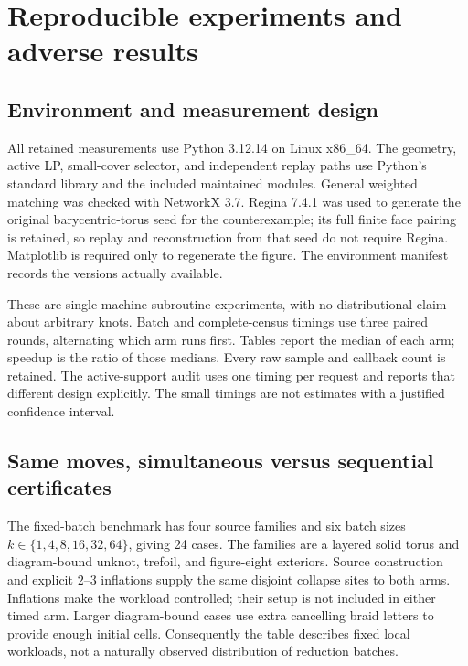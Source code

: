 \section{Reproducible experiments and adverse results}
\label{sec:experiments}


\subsection{Environment and measurement design}

All retained measurements use Python 3.12.14 on Linux x86\_64. The geometry,
active LP, small-cover selector, and independent replay paths use Python's
standard library and the included maintained modules. General weighted
matching was checked with NetworkX 3.7. Regina 7.4.1 was used to generate
the original barycentric-torus seed for the counterexample; its full finite
face pairing is retained, so replay and reconstruction from that seed do
not require Regina. Matplotlib is required only to regenerate the figure.
The environment manifest records the versions actually available.

These are single-machine subroutine experiments, with no distributional
claim about arbitrary knots. Batch and complete-census timings use three
paired rounds, alternating which arm runs first. Tables report the median
of each arm; speedup is the ratio of those medians. Every raw sample and
callback count is retained. The active-support audit uses one timing per
request and reports that different design explicitly. The small timings
are not estimates with a justified confidence interval.

\subsection{Same moves, simultaneous versus sequential certificates}

The fixed-batch benchmark has four source families and six batch sizes
$k\in\{1,4,8,16,32,64\}$, giving 24 cases. The families are a layered solid
torus and diagram-bound unknot, trefoil, and figure-eight exteriors.
Source construction and explicit $2$--$3$ inflations supply the same
disjoint collapse sites to both arms. Inflations make the workload
controlled; their setup is not included in either timed arm. Larger
diagram-bound cases use extra cancelling braid letters to provide enough
initial cells. Consequently the table describes fixed local workloads,
not a naturally observed distribution of reduction batches.

